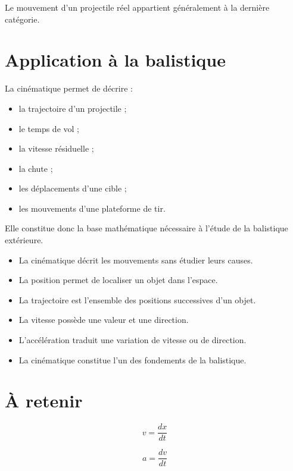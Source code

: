 Le mouvement d'un projectile réel appartient généralement à la dernière
catégorie.

\section{Application à la balistique}

La cinématique permet de décrire :

\begin{itemize}
    \item la trajectoire d'un projectile ;
    \item le temps de vol ;
    \item la vitesse résiduelle ;
    \item la chute ;
    \item les déplacements d'une cible ;
    \item les mouvements d'une plateforme de tir.
\end{itemize}

Elle constitue donc la base mathématique nécessaire à l'étude de la
balistique extérieure.


\begin{aretenir}

\begin{itemize}
    \item La cinématique décrit les mouvements sans étudier leurs causes.
    \item La position permet de localiser un objet dans l'espace.
    \item La trajectoire est l'ensemble des positions successives d'un objet.
    \item La vitesse possède une valeur et une direction.
    \item L'accélération traduit une variation de vitesse ou de direction.
    \item La cinématique constitue l'un des fondements de la balistique.
\end{itemize}

\section{À retenir}

\end{aretenir}

\begin{rigueur}
    \begin{equation}
    v = \frac{dx}{dt}
    \end{equation}

    \begin{equation}
    a = \frac{dv}{dt}
    \end{equation}
\end{rigueur}
